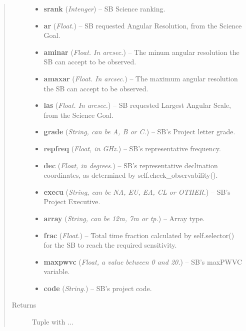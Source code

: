\documentclass[a4paper,10pt,english]{sphinxmanual}
\begin{document}
\begin{fulllineitems}
\begin{fulllineitems}
\begin{quote}
\begin{description}
\begin{itemize}
\item {} 
\textbf{srank} (\emph{Intenger}) -- SB Science ranking.

\item {} 
\textbf{ar} (\emph{Float.}) -- SB requested Angular Resolution, from the Science Goal.

\item {} 
\textbf{aminar} (\emph{Float. In arcsec.}) -- The minum angular resolution the SB can accept to be
observed.

\item {} 
\textbf{amaxar} (\emph{Float. In arcsec.}) -- The maximum angular resolution the SB can accept to be
observed.

\item {} 
\textbf{las} (\emph{Float. In arcsec.}) -- SB requested Largest Angular Scale, from the Science Goal.

\item {} 
\textbf{grade} (\emph{String, can be A, B or C.}) -- SB's Project letter grade.

\item {} 
\textbf{repfreq} (\emph{Float, in GHz.}) -- SB's representative frequency.

\item {} 
\textbf{dec} (\emph{Float, in degrees.}) -- SB's representative declination coordinates, as determined
by self.check\_observability().

\item {} 
\textbf{execu} (\emph{String, can be NA, EU, EA, CL or OTHER.}) -- SB's Project Executive.

\item {} 
\textbf{array} (\emph{String, can be 12m, 7m or tp.}) -- Array type.

\item {} 
\textbf{frac} (\emph{Float.}) -- Total time fraction calculated by self.selector() for the
SB to reach the required sensitivity.

\item {} 
\textbf{maxpwvc} (\emph{Float, a value between 0 and 20.}) -- SB's maxPWVC variable.

\item {} 
\textbf{code} (\emph{String.}) -- SB's project code.

\end{itemize}

\item[{Returns}] \leavevmode
Tuple with ...

\end{description}\end{quote}


\end{fulllineitems}
\end{fulllineitems}
\end{document}
